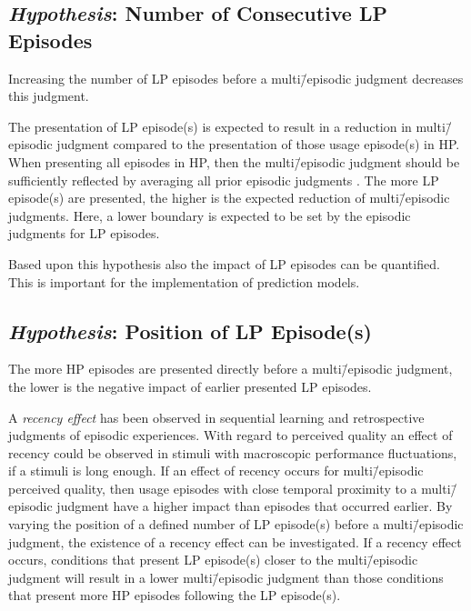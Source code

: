 \subsection[H1: Number of Consecutive \acs{LP} Episodes]{\emph{Hypothesis}: Number of Consecutive \acs{LP} Episodes}
\begin{hypothesis}\label{hypo:number}
Increasing the number of \ac{LP} episodes before a multi\=/episodic judgment decreases this judgment.
\end{hypothesis}

The presentation of \ac{LP} episode(s) is expected to result in a reduction in multi\=/episodic judgment compared to the presentation of those usage episode(s) in \ac{HP}.
When presenting all episodes in \ac{HP}, then the multi\=/episodic judgment should be sufficiently reflected by averaging all prior episodic judgments \citep[\cf,][]{moller_single-call_2011}.
The more \ac{LP} episode(s) are presented, the higher is the expected reduction of multi\=/episodic judgments.
Here, a lower boundary is expected to be set by the episodic judgments for \ac{LP} episodes.

Based upon this hypothesis also the impact of \ac{LP} episodes can be quantified.
This is important for the implementation of prediction models.


\subsection[H2: Position of \acs{LP} Episode(s)]{\emph{Hypothesis}: Position of \acs{LP} Episode(s)}
\begin{hypothesis}\label{hypo:position}
The more \ac{HP} episodes are presented directly before a multi\=/episodic judgment, the lower is the negative impact of earlier presented \ac{LP} episodes.
\end{hypothesis}

A \emph{recency effect} has been observed in sequential learning and retrospective judgments of episodic experiences.
With regard to perceived quality an effect of recency could be observed in stimuli with macroscopic performance fluctuations, if a stimuli is long enough.
If an effect of recency occurs for multi\=/episodic perceived quality, then usage episodes with close temporal proximity to a multi\=/episodic judgment have a higher impact than episodes that occurred earlier.
By varying the position of a defined number of \ac{LP} episode(s) before a multi\=/episodic judgment, the existence of a recency effect can be investigated.
If a recency effect occurs, conditions that present \ac{LP} episode(s) closer to the multi\=/episodic judgment will result in a lower multi\=/episodic judgment than those conditions that present more \ac{HP} episodes following the \ac{LP} episode(s).

